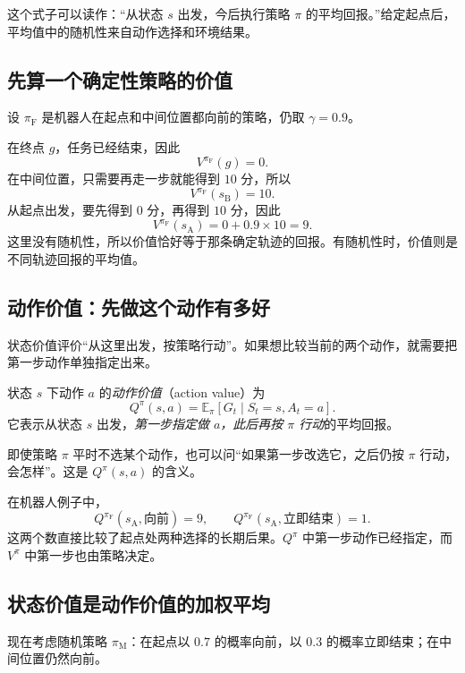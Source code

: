 \documentclass[UTF8,12pt,a4paper,fontset=fandol]{ctexart}
\begin{document}
这个式子可以读作：“从状态 $s$ 出发，今后执行策略 $\pi$ 的平均回报。”给定起点后，平均值中的随机性来自动作选择和环境结果。

\subsection{先算一个确定性策略的价值}

设 $\pi_{\mathrm F}$ 是机器人在起点和中间位置都向前的策略，仍取 $\gamma=0.9$。

在终点 $g$，任务已经结束，因此
\[
  V^{\pi_{\mathrm F}}(g)=0.
\]
在中间位置，只需要再走一步就能得到 $10$ 分，所以
\[
  V^{\pi_{\mathrm F}}(s_{\mathrm B})=10.
\]
从起点出发，要先得到 $0$ 分，再得到 $10$ 分，因此
\[
  V^{\pi_{\mathrm F}}(s_{\mathrm A})=0+0.9\times10=9.
\]
这里没有随机性，所以价值恰好等于那条确定轨迹的回报。有随机性时，价值则是不同轨迹回报的平均值。

\subsection{动作价值：先做这个动作有多好}

状态价值评价“从这里出发，按策略行动”。如果想比较当前的两个动作，就需要把第一步动作单独指定出来。

\begin{definition}[动作价值函数]
状态 $s$ 下动作 $a$ 的\emph{动作价值}（action value）为
\begin{equation}
  Q^\pi(s,a)=\mathbb E_\pi[G_t\mid S_t=s,A_t=a].
  \label{eq:mdp-action-value}
\end{equation}
它表示从状态 $s$ 出发，\emph{第一步指定做 $a$，此后再按 $\pi$ 行动}的平均回报。
\end{definition}

即使策略 $\pi$ 平时不选某个动作，也可以问“如果第一步改选它，之后仍按 $\pi$ 行动，会怎样”。这是 $Q^\pi(s,a)$ 的含义。

在机器人例子中，
\[
  Q^{\pi_{\mathrm F}}(s_{\mathrm A},\text{向前})=9,
  \qquad
  Q^{\pi_{\mathrm F}}(s_{\mathrm A},\text{立即结束})=1.
\]
这两个数直接比较了起点处两种选择的长期后果。$Q^\pi$ 中第一步动作已经指定，而 $V^\pi$ 中第一步也由策略决定。

\subsection{状态价值是动作价值的加权平均}

现在考虑随机策略 $\pi_{\mathrm M}$：在起点以 $0.7$ 的概率向前，以 $0.3$ 的概率立即结束；在中间位置仍然向前。
\end{document}
